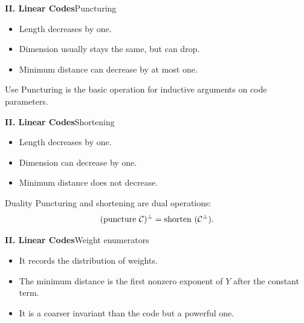\begin{frame}{\textbf{II. Linear Codes}}{Puncturing}
\small
{}
\begin{itemize}
  \item Length decreases by one.
  \item Dimension usually stays the same, but can drop.
  \item Minimum distance can decrease by at most one.
\end{itemize}
\begin{block}{Use}
Puncturing is the basic operation for inductive arguments on code parameters.
\end{block}
\end{frame}

\begin{frame}{\textbf{II. Linear Codes}}{Shortening}
\small
{}
\begin{itemize}
  \item Length decreases by one.
  \item Dimension can decrease by one.
  \item Minimum distance does not decrease.
\end{itemize}
\begin{block}{Duality}
Puncturing and shortening are dual operations:
\[
  (\text{puncture } \mathcal{C})^\perp=\text{shorten }(\mathcal{C}^\perp).
\]
\end{block}
\end{frame}

\begin{frame}{\textbf{II. Linear Codes}}{Weight enumerators}
\small
{}
\begin{itemize}
  \item It records the distribution of weights.
  \item The minimum distance is the first nonzero exponent of $Y$ after the constant term.
  \item It is a coarser invariant than the code but a powerful one.
\end{itemize}
\end{frame}

